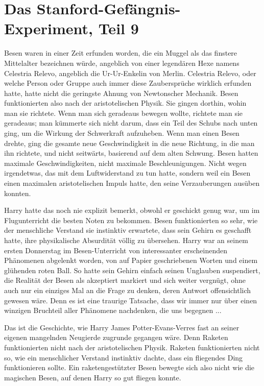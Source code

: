 \chapter{Das Stanford-Gefängnis-Experiment, Teil 9}

Besen waren in einer Zeit erfunden worden, die ein Muggel als das finstere
Mittelalter bezeichnen würde, angeblich von einer legendären Hexe namens
Celestria Relevo, angeblich die Ur-Ur-Enkelin von Merlin. Celestria Relevo, oder
welche Person oder Gruppe auch immer diese Zaubersprüche wirklich erfunden
hatte, hatte nicht die geringste Ahnung von Newtonscher Mechanik. Besen
funktionierten also nach der aristotelischen Physik. Sie gingen dorthin, wohin
man sie richtete. Wenn man sich geradeaus bewegen wollte, richtete man sie
geradeaus; man kümmerte sich nicht darum, dass ein Teil des Schubs nach unten
ging, um die Wirkung der Schwerkraft aufzuheben. Wenn man einen Besen drehte,
ging die gesamte neue Geschwindigkeit in die neue Richtung, in die man ihn
richtete, und nicht seitwärts, basierend auf dem alten Schwung. Besen hatten
maximale Geschwindigkeiten, nicht maximale Beschleunigungen. Nicht wegen
irgendetwas, das mit dem Luftwiderstand zu tun hatte, sondern weil ein Besen
einen maximalen aristotelischen Impuls hatte, den seine Verzauberungen ausüben
konnten.

Harry hatte das noch nie explizit bemerkt, obwohl er geschickt genug war, um im
Flugunterricht die besten Noten zu bekommen. Besen funktionierten so sehr, wie
der menschliche Verstand sie instinktiv erwartete, dass sein Gehirn es geschafft
hatte, ihre physikalische Absurdität völlig zu übersehen. Harry war an seinem
ersten Donnerstag im Besen-Unterricht von interessanter erscheinenden Phänomenen
abgelenkt worden, von auf Papier geschriebenen Worten und einem glühenden roten
Ball. So hatte sein Gehirn einfach seinen Unglauben suspendiert, die Realität
der Besen als akzeptiert markiert und sich weiter vergnügt, ohne auch nur ein
einziges Mal an die Frage zu denken, deren Antwort offensichtlich gewesen wäre.
Denn es ist eine traurige Tatsache, dass wir immer nur über einen winzigen
Bruchteil aller Phänomene nachdenken, die uns begegnen ...

Das ist die Geschichte, wie Harry James Potter-Evans-Verres fast an seiner
eigenen mangelnden Neugierde zugrunde gegangen wäre. Denn Raketen funktionierten
nicht nach der aristotelischen Physik. Raketen funktionierten nicht so, wie ein
menschlicher Verstand instinktiv dachte, dass ein fliegendes Ding funktionieren
sollte. Ein raketengestützter Besen bewegte sich also nicht wie die magischen
Besen, auf denen Harry so gut fliegen konnte.

